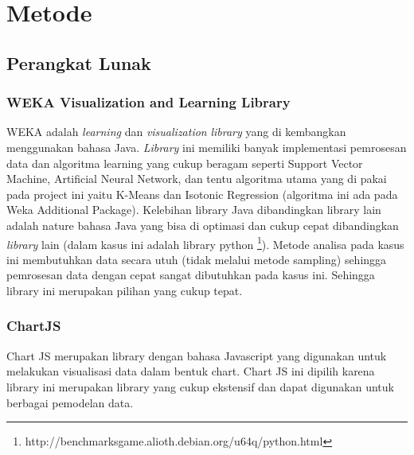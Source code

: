 \documentclass{article}
\begin{document}
\section{Metode}

\subsection{Perangkat Lunak}

\subsubsection{WEKA Visualization and Learning Library}
\begin{adjustwidth}{4em}{0pt}

\hspace{\parindent}WEKA adalah \textit{learning} dan \textit{visualization} \textit{library} yang di kembangkan menggunakan bahasa Java. \textit{Library} ini memiliki banyak implementasi pemrosesan data dan algoritma learning yang cukup beragam seperti Support Vector Machine, Artificial Neural Network, dan tentu algoritma utama yang di pakai pada project ini yaitu K-Means dan Isotonic Regression (algoritma ini ada pada Weka Additional Package). Kelebihan library Java dibandingkan library lain adalah nature bahasa Java yang bisa di optimasi dan cukup cepat dibandingkan \textit{library} lain (dalam kasus ini adalah library python \footnote{http://benchmarksgame.alioth.debian.org/u64q/python.html}). Metode analisa pada kasus  ini membutuhkan data secara utuh (tidak melalui metode sampling) sehingga pemrosesan data dengan cepat sangat dibutuhkan pada kasus ini. Sehingga library ini merupakan pilihan yang cukup tepat.

\end{adjustwidth}

\subsubsection{ChartJS}
\begin{adjustwidth}{4em}{0pt}
	
\hspace{\parindent}Chart JS merupakan library dengan bahasa Javascript yang digunakan untuk melakukan visualisasi data dalam bentuk chart. Chart JS ini dipilih karena library ini merupakan library yang cukup ekstensif dan dapat digunakan untuk berbagai pemodelan data.

\end{adjustwidth}
\end{document}
